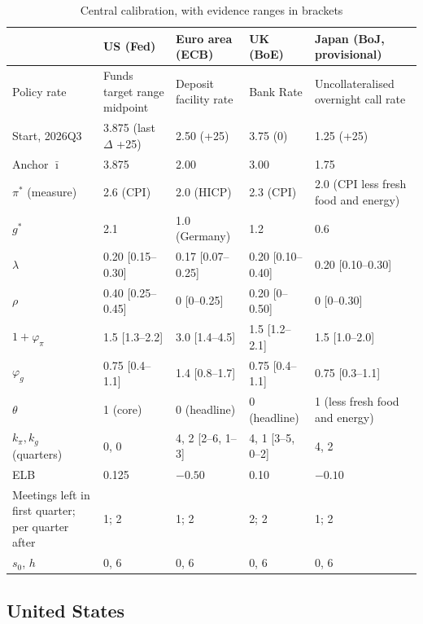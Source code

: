 \documentclass[11pt,a4paper]{article}
\newcommand{\ib}{\bar{\imath}}
\newcommand{\pis}{\pi^{*}}
\newcommand{\gs}{g^{*}}
\begin{document}
\begin{table}[htbp]
\centering\footnotesize
\caption{Central calibration, with evidence ranges in brackets}
\label{tab:calib}
\setlength\tabcolsep{4pt}
\begin{tabular}{@{}L{34mm}L{27mm}L{27mm}L{27mm}L{31mm}@{}}
\toprule
 & US (Fed) & Euro area (ECB) & UK (BoE) & Japan (BoJ, provisional) \\
\midrule
Policy rate & Funds target range midpoint & Deposit facility rate & Bank Rate & Uncollateralised overnight call rate \\
Start, 2026Q3 & 3.875 (last $\Delta$ +25) & 2.50 (+25) & 3.75 (0) & 1.25 (+25) \\
Anchor $\ib$ & 3.875 & 2.00 & 3.00 & 1.75 \\
$\pis$ (measure) & 2.6 (CPI) & 2.0 (HICP) & 2.3 (CPI) & 2.0 (CPI less fresh food and energy) \\
$\gs$ & 2.1 & 1.0 (Germany) & 1.2 & 0.6 \\
$\lambda$ & 0.20 [0.15--0.30] & 0.17 [0.07--0.25] & 0.20 [0.10--0.40] & 0.20 [0.10--0.30] \\
$\rho$ & 0.40 [0.25--0.45] & 0 [0--0.25] & 0.20 [0--0.50] & 0 [0--0.30] \\
$1+\varphi_\pi$ & 1.5 [1.3--2.2] & 3.0 [1.4--4.5] & 1.5 [1.2--2.1] & 1.5 [1.0--2.0] \\
$\varphi_g$ & 0.75 [0.4--1.1] & 1.4 [0.8--1.7] & 0.75 [0.4--1.1] & 0.75 [0.3--1.1] \\
$\theta$ & 1 (core) & 0 (headline) & 0 (headline) & 1 (less fresh food and energy) \\
$k_\pi, k_g$ (quarters) & 0, 0 & 4, 2 [2--6, 1--3] & 4, 1 [3--5, 0--2] & 4, 2 \\
ELB & 0.125 & $-0.50$ & 0.10 & $-0.10$ \\
Meetings left in first quarter; per quarter after & 1; 2 & 1; 2 & 2; 2 & 1; 2 \\
$s_0$, $h$ & 0, 6 & 0, 6 & 0, 6 & 0, 6 \\
\bottomrule
\end{tabular}
\end{table}

\subsection{United States}
\end{document}
